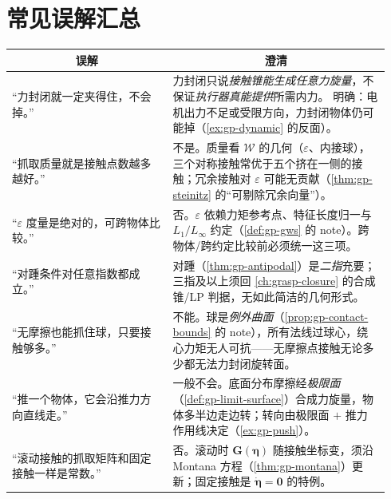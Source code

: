 \section*{常见误解汇总}
\begin{longtable}{p{0.40\linewidth} p{0.54\linewidth}}
\toprule
\multicolumn{1}{c}{误解} & \multicolumn{1}{c}{澄清} \\
\midrule
\endhead
“力封闭就一定夹得住，不会掉。” & 力封闭只说\emph{接触锥能生成任意力旋量}，不保证\emph{执行器真能提供}所需内力。\cite{lynch2017modern} 明确：电机出力不足或受限方向，力封闭物体仍可能掉（\cref{ex:gp-dynamic} 的反面）。\\
“抓取质量就是接触点数越多越好。” & 不是。质量看 $\mathcal{W}$ 的几何（$\varepsilon$、内接球），三个对称接触常优于五个挤在一侧的接触；冗余接触对 $\varepsilon$ 可能无贡献（\cref{thm:gp-steinitz} 的“可剔除冗余向量”）。\\
“$\varepsilon$ 度量是绝对的，可跨物体比较。” & 否。$\varepsilon$ 依赖力矩参考点、特征长度归一与 $L_1/L_\infty$ 约定（\cref{def:gp-gws} 的 note）。跨物体/跨约定比较前必须统一这三项。\\
“对踵条件对任意指数都成立。” & 对踵（\cref{thm:gp-antipodal}）是\emph{二指}充要；三指及以上须回 \cref{ch:grasp-closure} 的合成锥/LP 判据，无如此简洁的几何形式。\\
“无摩擦也能抓住球，只要接触够多。” & 不能。球是\emph{例外曲面}（\cref{prop:gp-contact-bounds} 的 note），所有法线过球心，绕心力矩无人可抗——无摩擦点接触无论多少都无法力封闭旋转面。\\
“推一个物体，它会沿推力方向直线走。” & 一般不会。底面分布摩擦经\emph{极限面}（\cref{def:gp-limit-surface}）合成力旋量，物体多半边走边转；转向由极限面 $+$ 推力作用线决定（\cref{ex:gp-push}）。\\
“滚动接触的抓取矩阵和固定接触一样是常数。” & 否。滚动时 $\mathbf{G}(\boldsymbol{\eta})$ 随接触坐标变，须沿 Montana 方程（\cref{thm:gp-montana}）更新；固定接触是 $\dot{\boldsymbol{\eta}}=\mathbf{0}$ 的特例。\\
\bottomrule
\end{longtable}

